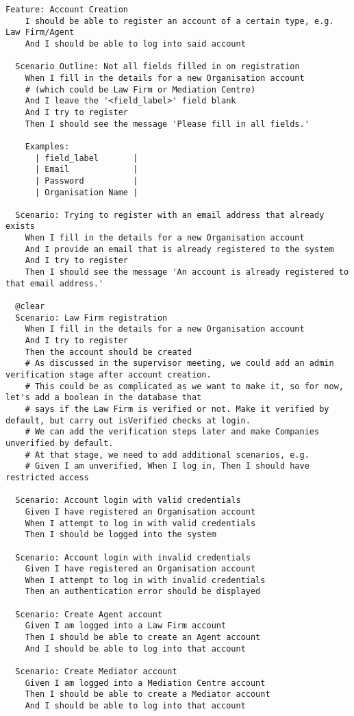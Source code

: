 \begin{lstlisting}
Feature: Account Creation
    I should be able to register an account of a certain type, e.g. Law Firm/Agent
    And I should be able to log into said account

  Scenario Outline: Not all fields filled in on registration
    When I fill in the details for a new Organisation account
    # (which could be Law Firm or Mediation Centre)
    And I leave the '<field_label>' field blank
    And I try to register
    Then I should see the message 'Please fill in all fields.'

    Examples:
      | field_label       |
      | Email             |
      | Password          |
      | Organisation Name |

  Scenario: Trying to register with an email address that already exists
    When I fill in the details for a new Organisation account
    And I provide an email that is already registered to the system
    And I try to register
    Then I should see the message 'An account is already registered to that email address.'

  @clear
  Scenario: Law Firm registration
    When I fill in the details for a new Organisation account
    And I try to register
    Then the account should be created
    # As discussed in the supervisor meeting, we could add an admin verification stage after account creation.
    # This could be as complicated as we want to make it, so for now, let's add a boolean in the database that
    # says if the Law Firm is verified or not. Make it verified by default, but carry out isVerified checks at login.
    # We can add the verification steps later and make Companies unverified by default.
    # At that stage, we need to add additional scenarios, e.g.
    # Given I am unverified, When I log in, Then I should have restricted access

  Scenario: Account login with valid credentials
    Given I have registered an Organisation account
    When I attempt to log in with valid credentials
    Then I should be logged into the system

  Scenario: Account login with invalid credentials
    Given I have registered an Organisation account
    When I attempt to log in with invalid credentials
    Then an authentication error should be displayed

  Scenario: Create Agent account
    Given I am logged into a Law Firm account
    Then I should be able to create an Agent account
    And I should be able to log into that account

  Scenario: Create Mediator account
    Given I am logged into a Mediation Centre account
    Then I should be able to create a Mediator account
    And I should be able to log into that account
\end{lstlisting}


